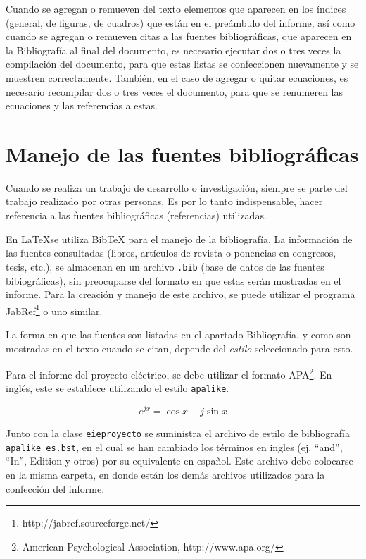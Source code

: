 Cuando se agregan o remueven del texto elementos que aparecen en los índices (general, de figuras, de cuadros) que están en el preámbulo del informe, así como cuando se agregan o remueven citas a las fuentes bibliográficas, que aparecen en la Bibliografía al final del documento, es necesario ejecutar dos o tres veces la compilación del documento, para que estas listas se confeccionen nuevamente y se muestren correctamente.  También, en el caso de agregar o quitar ecuaciones, es necesario recompilar dos o tres veces el documento, para que se renumeren las ecuaciones y  las referencias a estas.

\section{Manejo de las fuentes bibliográficas}
Cuando se realiza un trabajo de desarrollo o investigación, siempre se parte del trabajo realizado por otras personas. Es por lo tanto indispensable, hacer referencia a las fuentes bibliográficas (referencias) utilizadas.

En \LaTeX se utiliza BibTeX para el manejo de la bibliografía.  La información de las fuentes consultadas (libros, artículos de revista o ponencias en congresos, tesis, etc.), se almacenan en un archivo \texttt{.bib} (base de datos de las fuentes bibiográficas), sin preocuparse del formato en que estas serán mostradas en el informe.  Para la creación y manejo de este archivo, se puede utilizar el programa JabRef\footnote{http://jabref.sourceforge.net/} o uno similar.

La forma en que las fuentes son listadas en el apartado Bibliografía, y como son mostradas en el texto cuando se citan, depende del \emph{estilo} seleccionado para esto.

Para el informe del proyecto eléctrico, se debe utilizar el formato APA\footnote{American Psychological Association, http://www.apa.org/}.  En inglés, este se establece utilizando el estilo \texttt{apalike}.  

\begin{equation}
 e^{jx} = \cos{x} + j \sin{x}
\end{equation}


Junto con la clase \texttt{eieproyecto} se suministra el archivo de estilo de bibliografía \texttt{apalike\_es.bst}, en el cual se han cambiado los términos en ingles (ej. ``and'', ``In'', Edition y otros) por su equivalente en español.  Este archivo debe colocarse en la misma carpeta, en donde están los demás archivos utilizados para la confección del informe.


